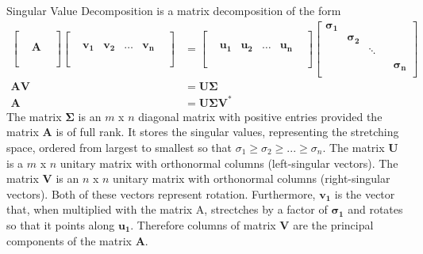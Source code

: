 \documentclass{article}
\begin{document}
Singular Value Decomposition is a matrix decomposition of the form
\begin{align*}
\begin{bmatrix}
&&\\
&&\\
&\textbf{A}& \\
&&\\
&&\\
\end{bmatrix}
\begin{bmatrix}
&&\\
&&\\
&\mathbf{v_1}& \mathbf{v_2}& \hdots & \mathbf{v_n}&\\
&&\\
&&\\
\end{bmatrix}
&=
\begin{bmatrix}
&&\\
&&\\
&\mathbf{u_1}& \mathbf{u_2}& \hdots & \mathbf{u_n}&\\
&&\\
&&\\
\end{bmatrix}
\begin{bmatrix} 
\mathbf{\sigma_1}&&\\
&\mathbf{\sigma_2}&\\
&& \ddots \\
&&&& \\
&&&&\mathbf{\sigma_n}\\
\end{bmatrix} \\
\mathbf{AV} &= \mathbf{U\Sigma} \\
\mathbf{A} &= \mathbf{U\Sigma V^{*}}
\end{align*}
The matrix $\mathbf{\Sigma}$ is an $m$ x $n$ diagonal matrix with positive entries provided the matrix \textbf{A} is of full rank. It stores the singular values, representing the stretching space, ordered from largest to smallest so that $\sigma_1 \ge \sigma_2 \ge ... \ge \sigma_n$. The matrix \textbf{U} is a $m$ x $n$ unitary matrix with orthonormal columns (left-singular vectors). The matrix \textbf{V} is an $n$ x $n$ unitary matrix with orthonormal columns (right-singular vectors). Both of these vectors represent rotation. Furthermore, $\mathbf{v_1}$ is the vector that, when multiplied with the matrix A, strectches by a factor of $\mathbf{\sigma_1}$ and rotates so that it points along $\mathbf{u_1}$. Therefore columns of matrix \textbf{V} are the principal components of the matrix \textbf{A}. \\
\end{document}
